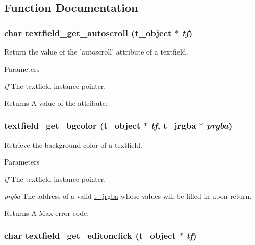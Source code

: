 \subsection{Function Documentation}
\hypertarget{group__textfield_ga44071d73524732acc603e99602b88494}{
\subsubsection[{textfield\_\-get\_\-autoscroll}]{\setlength{\rightskip}{0pt plus 5cm}char textfield\_\-get\_\-autoscroll ({\bf t\_\-object} $\ast$ {\em tf})}}
\label{group__textfield_ga44071d73524732acc603e99602b88494}


Return the value of the 'autoscroll' attribute of a textfield. 
\begin{DoxyParams}{Parameters}
\item[{\em tf}]The textfield instance pointer. \end{DoxyParams}
\begin{DoxyReturn}{Returns}
A value of the attribute. 
\end{DoxyReturn}
\hypertarget{group__textfield_ga98b305f4949a40de1827a75c4b5d9d8a}{
\subsubsection[{textfield\_\-get\_\-bgcolor}]{ textfield\_\-get\_\-bgcolor ({\bf t\_\-object} $\ast$ {\em tf}, \/  {\bf t\_\-jrgba} $\ast$ {\em prgba})}}
\label{group__textfield_ga98b305f4949a40de1827a75c4b5d9d8a}


Retrieve the background color of a textfield. 
\begin{DoxyParams}{Parameters}
\item[{\em tf}]The textfield instance pointer. \item[{\em prgba}]The address of a valid \hyperlink{structt__jrgba}{t\_\-jrgba} whose values will be filled-\/in upon return. \end{DoxyParams}
\begin{DoxyReturn}{Returns}
A Max error code. 
\end{DoxyReturn}
\hypertarget{group__textfield_ga3ef42ba21834fa1ca912958267d6a3b0}{
\subsubsection[{textfield\_\-get\_\-editonclick}]{\setlength{\rightskip}{0pt plus 5cm}char textfield\_\-get\_\-editonclick ({\bf t\_\-object} $\ast$ {\em tf})}}
\label{group__textfield_ga3ef42ba21834fa1ca912958267d6a3b0}


